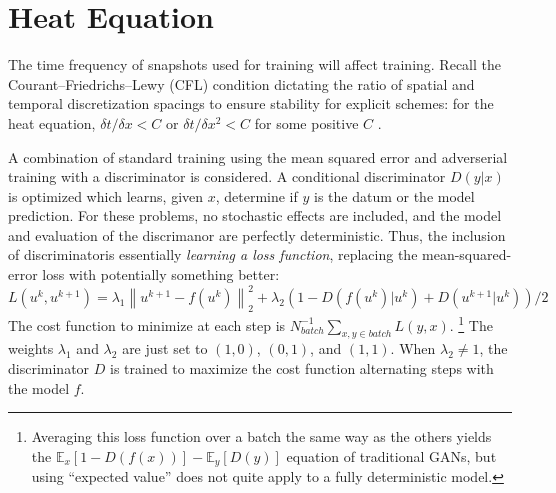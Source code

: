 \documentclass{article}
\begin{document}
\section{Heat Equation}

The time frequency of snapshots used for training will affect training.
Recall the Courant–Friedrichs–Lewy (CFL) condition dictating the ratio
of spatial and temporal discretization spacings to ensure stability
for explicit schemes: for the heat equation, $\delta t / \delta x < C$ or $\delta t / \delta
x^2<C$ for some positive $C$ \cite{leveque_finite_2007}.




A combination of standard training using the mean squared error and
adverserial training with a discriminator is considered. A conditional discriminator $D(y|x)$ is optimized which learns, given $x$, determine if $y$ is the datum or the model prediction. For these problems, no stochastic effects are included, and the model and evaluation of the discrimanor are perfectly deterministic. Thus, the inclusion of discriminatoris essentially {\em learning a loss function}, replacing the mean-squared-error loss with potentially something better: 
\begin{equation}
L\left(u^k,u^{k+1}\right) = \lambda_1 \left\| u^{k+1}-f(u^k)
\right\|_2^2 + \lambda_2\left(1 - D\left(f(u^k)|u^k\right) + D\left(u^{k+1}|u^k\right)\right)/2
\end{equation}
The cost function to minimize at each step is
$N_{batch}^{-1}\sum_{x,y\in batch} L(y,x)$. \footnote{Averaging this
  loss function over a batch the same way as the others yields the
  $\mathbb{E}_x[1-D(f(x))]-\mathbb{E}_y[D(y)]$ equation of traditional
  GANs, but using ``expected value'' does not quite apply to a fully
  deterministic model.} The weights $\lambda_1$ and $\lambda_2$ are
just set to $(1,0)$, $(0,1)$, and $(1,1)$. When $\lambda_2\neq 1$, the
discriminator $D$ is trained to maximize the cost function alternating
steps with the model $f$.
\end{document}
